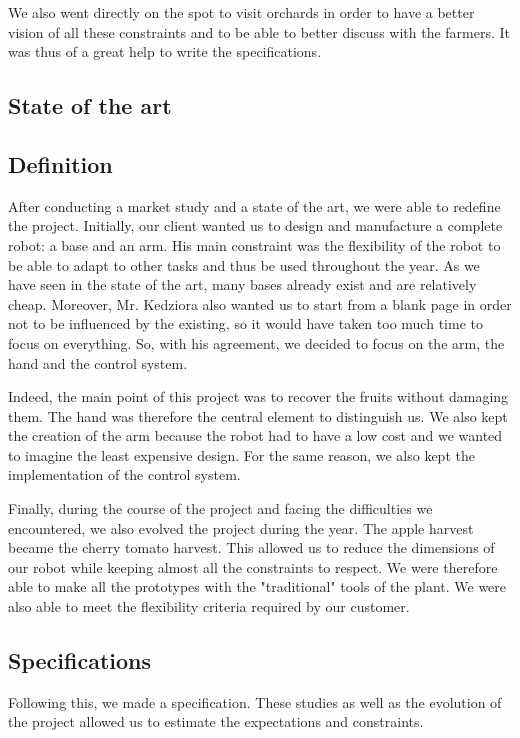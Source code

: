 \bigbreak
We also went directly on the spot to visit orchards in order to have a better vision of all these constraints and to be able to better discuss with the farmers. It was thus of a great help to write the specifications. 

\subsection{State of the art}

\subsection{Definition}

After conducting a market study and a state of the art, we were able to redefine the project. Initially, our client wanted us to design and manufacture a complete robot: a base and an arm. His main constraint was the flexibility of the robot to be able to adapt to other tasks and thus be used throughout the year. As we have seen in the state of the art, many bases already exist and are relatively cheap. Moreover, Mr. Kedziora also wanted us to start from a blank page in order not to be influenced by the existing, so it would have taken too much time to focus on everything. So, with his agreement, we decided to focus on the arm, the hand and the control system. 

\bigbreak
Indeed, the main point of this project was to recover the fruits without damaging them. The hand was therefore the central element to distinguish us. We also kept the creation of the arm because the robot had to have a low cost and we wanted to imagine the least expensive design. For the same reason, we also kept the implementation of the control system. 

\bigbreak
Finally, during the course of the project and facing the difficulties we encountered, we also evolved the project during the year. The apple harvest became the cherry tomato harvest. This allowed us to reduce the dimensions of our robot while keeping almost all the constraints to respect. We were therefore able to make all the prototypes with the "traditional" tools of the plant. We were also able to meet the flexibility criteria required by our customer. 

\subsection{Specifications}

Following this, we made a specification. These studies as well as the evolution of the project allowed us to estimate the expectations and constraints. 


